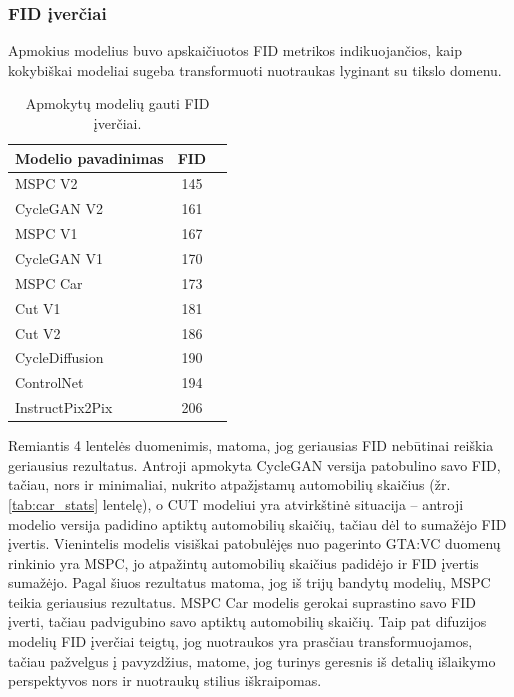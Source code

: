 \documentclass{VUMIFPSbakalaurinis}
\begin{document}
        \subsubsection{FID įverčiai}
            Apmokius modelius buvo apskaičiuotos FID metrikos indikuojančios, kaip kokybiškai modeliai sugeba transformuoti nuotraukas lyginant su tikslo domenu.
            \begin{table}[H]
                \footnotesize
                \centering
                \caption{Apmokytų modelių gauti FID įverčiai.}
                {\begin{tabular}{|l|c|c|} \hline
                    Modelio pavadinimas & FID\\
                    \hline
                    MSPC V2 & 145\\
                    CycleGAN V2 & 161\\
                    MSPC V1 & 167\\
                    CycleGAN V1 & 170\\
                    MSPC Car & 173\\ %
                    Cut V1 & 181\\
                    Cut V2 & 186\\ 
                    CycleDiffusion & 190\\ %
                    ControlNet & 194\\ %
                    InstructPix2Pix & 206\\ %
                    \hline
                    \end{tabular}
                }
                \label{tab:table example}
            \end{table}
    
            Remiantis 4 lentelės duomenimis, matoma, jog geriausias FID nebūtinai reiškia geriausius rezultatus. Antroji apmokyta CycleGAN versija patobulino savo FID, tačiau, nors ir minimaliai, nukrito atpažįstamų automobilių skaičius (žr. \ref{tab:car_stats} lentelę), o CUT modeliui yra atvirkštinė situacija – antroji modelio versija padidino aptiktų automobilių skaičių, tačiau dėl to sumažėjo FID įvertis. Vienintelis modelis visiškai patobulėjęs nuo pagerinto GTA:VC duomenų rinkinio yra MSPC, jo atpažintų automobilių skaičius padidėjo ir FID įvertis sumažėjo. Pagal šiuos rezultatus matoma, jog iš trijų bandytų modelių, MSPC teikia geriausius rezultatus. MSPC Car modelis gerokai suprastino savo FID įverti, tačiau padvigubino savo aptiktų automobilių skaičių. Taip pat difuzijos modelių FID įverčiai teigtų, jog nuotraukos yra prasčiau transformuojamos, tačiau pažvelgus į pavyzdžius, matome, jog turinys geresnis iš detalių išlaikymo perspektyvos nors ir nuotraukų stilius iškraipomas.
\end{document}
